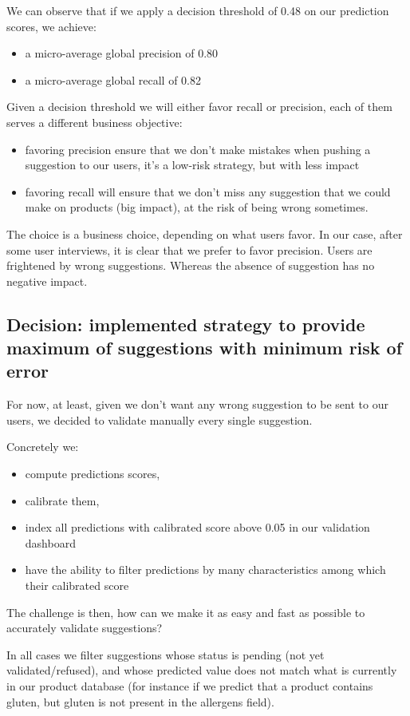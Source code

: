 We can observe that if we apply a decision threshold of 0.48 on our prediction scores, we achieve:
\begin{itemize}
	\item a micro-average global precision of 0.80
	\item a micro-average global recall of 0.82
\end{itemize}

Given a decision threshold we will either favor recall or precision, each of them serves a different business objective:
\begin{itemize}
	\item favoring precision ensure that we don't make mistakes when pushing a suggestion to our users, it's a low-risk strategy, but with less impact
	\item favoring recall will ensure that we don't miss any suggestion that we could make on products (big impact), at the risk of being wrong sometimes.
\end{itemize}

The choice is a business choice, depending on what users favor. In our case, after some user interviews, it is clear that we prefer to favor precision. Users are frightened by wrong suggestions. Whereas the absence of suggestion has no negative impact.

\subsection{Decision: implemented strategy to provide maximum of suggestions with minimum risk of error}

For now, at least, given we don't want any wrong suggestion to be sent to our users, we decided to validate manually every single suggestion.

Concretely we: 
\begin{itemize}
	\item compute predictions scores,
	\item calibrate them,
	\item index all predictions with calibrated score above 0.05 in our validation dashboard
	\item have the ability to filter predictions by many characteristics among which their calibrated score
\end{itemize}

The challenge is then, how can we make it as easy and fast as possible to accurately validate suggestions?

In all cases we filter suggestions whose status is pending (not yet validated/refused), and whose predicted value does not match what is currently in our product database (for instance if we predict that a product contains gluten, but gluten is not present in the allergens field).

